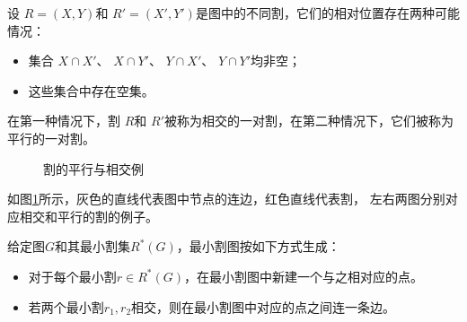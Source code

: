\begin{definition}[割的平行与相交]
  设 $R = (X, Y)$和 $R' = (X', Y')$是图中的不同割，它们的相对位置存在两种可能情况：
  \begin{itemize}
    \item 集合 $X \cap X'$、 $X \cap Y'$、 $Y \cap X'$、 $Y \cap Y'$均非空；
    \item 这些集合中存在空集。
  \end{itemize}
  在第一种情况下，割 $R$和 $R'$被称为相交的一对割，在第二种情况下，它们被称为平行的一对割。
\end{definition}
\begin{figure}[htb]
  \centering
  \hspace{4em}
  \caption{割的平行与相交例}
  \label{crosscut}
\end{figure}
如图\ref{crosscut}所示，灰色的直线代表图中节点的连边，红色直线代表割，
左右两图分别对应相交和平行的割的例子。

\begin{definition}[最小割图]
  给定图$G$和其最小割集$R^*(G)$，最小割图按如下方式生成：
  \begin{itemize}
    \item 对于每个最小割$r\in R^*(G)$，在最小割图中新建一个与之相对应的点。
    \item 若两个最小割$r_1,r_2$相交，则在最小割图中对应的点之间连一条边。
  \end{itemize}
\end{definition}


